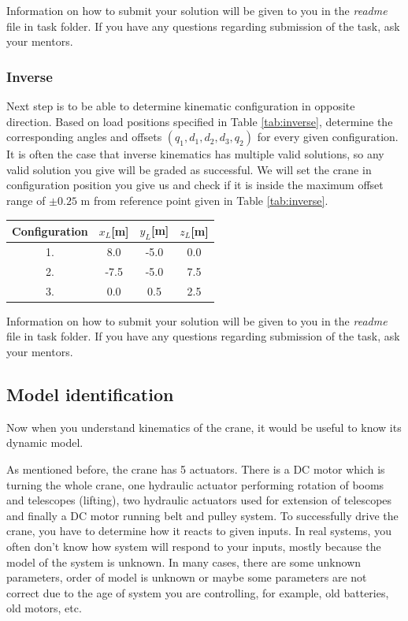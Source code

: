 \documentclass{article}
\begin{document}
	\noindent
	Information on how to submit your solution will be given to you in the \textit{readme} file in task folder. If you have any questions regarding submission of the task, ask your mentors.
	
	\subsubsection{Inverse}
	
	Next step is to be able to determine kinematic configuration in opposite direction. Based on load positions specified in Table \ref{tab:inverse}, determine the corresponding angles and offsets $(q_1, d_1, d_2, d_3, q_2)$ for every given configuration. It is often the case that inverse kinematics has multiple valid solutions, so any valid solution you give will be graded as successful. We will set the crane in configuration position you give us and check if it is inside the maximum offset range of $\pm 0.25$ m from reference point given in Table \ref{tab:inverse}.
	
	\begin{center}
		\label{tab:inverse}
		\label{tab:inverse}
		\begin{tabular}{|| c || c c c ||}
			\hline
			Configuration & $x_L$[m] & $y_L$[m] & $z_L$[m] \\
			\hline\hline
			1. & 8.0 & -5.0 & 0.0\\ 
			\hline
			2. & -7.5 & -5.0 & 7.5 \\
			\hline
			3. & 0.0 & 0.5 & 2.5 \\
			\hline
		\end{tabular}
	\end{center}
	
	\noindent
	Information on how to submit your solution will be given to you in the \textit{readme} file in task folder. If you have any questions regarding submission of the task, ask your mentors.
	
	\subsection{Model identification}
	
	Now when you understand kinematics of the crane, it would be useful to know its dynamic model.
	
	As mentioned before, the crane has 5 actuators. There is a DC motor which is turning the whole crane, one hydraulic actuator performing rotation of booms and telescopes (lifting), two hydraulic actuators used for extension of telescopes and finally a DC motor running belt and pulley system. To successfully drive the crane, you have to determine how it reacts to given inputs. In real systems, you often don't know how system will respond to your inputs, mostly because the model of the system is unknown. In many cases, there are some unknown parameters, order of model is unknown or maybe some parameters are not correct due to the age of system you are controlling, for example, old batteries, old motors, etc.
	
\end{document}
